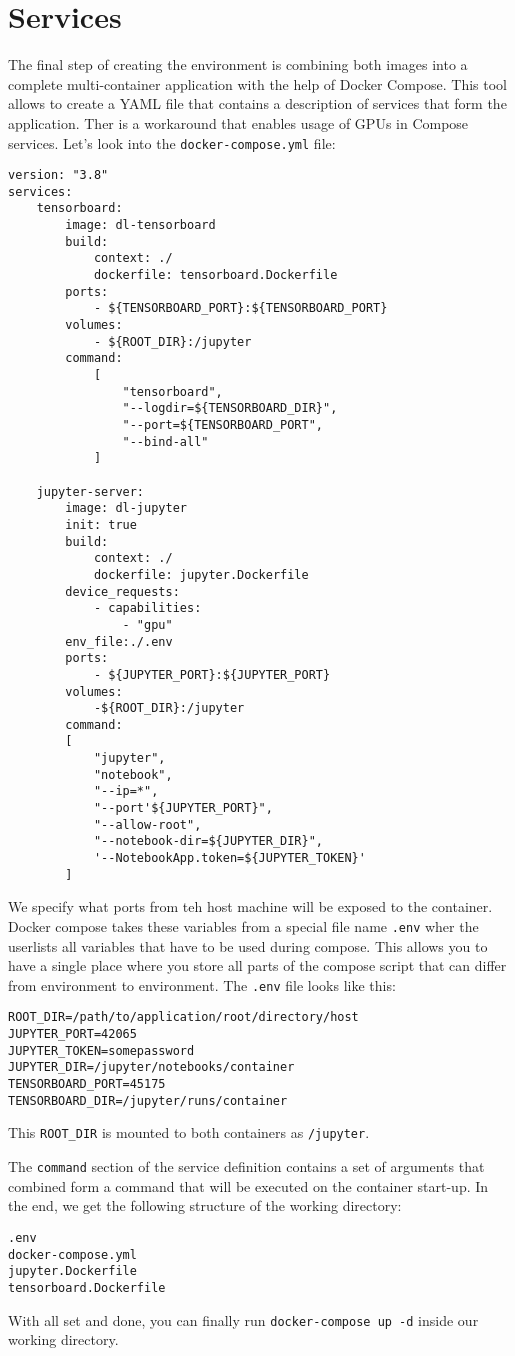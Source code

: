 \documentclass{article}
\begin{document}
\section{Services}
The final step of creating the environment is combining both images into a complete multi-container application with the help of Docker Compose.
This tool allows to create a YAML file that contains a description of services that form the application.
Ther is a workaround that enables usage of GPUs in Compose services.
Let's look into the \texttt{docker-compose.yml} file:
\begin{verbatim}
version: "3.8"
services:
    tensorboard:
        image: dl-tensorboard
        build:
            context: ./
            dockerfile: tensorboard.Dockerfile
        ports:
            - ${TENSORBOARD_PORT}:${TENSORBOARD_PORT}
        volumes:
            - ${ROOT_DIR}:/jupyter
        command:
            [
                "tensorboard",
                "--logdir=${TENSORBOARD_DIR}",
                "--port=${TENSORBOARD_PORT",
                "--bind-all"
            ]

    jupyter-server:
        image: dl-jupyter
        init: true
        build:
            context: ./
            dockerfile: jupyter.Dockerfile
        device_requests:
            - capabilities:
                - "gpu"
        env_file:./.env
        ports:
            - ${JUPYTER_PORT}:${JUPYTER_PORT}
        volumes:
            -${ROOT_DIR}:/jupyter
        command:
        [
            "jupyter",
            "notebook",
            "--ip=*",
            "--port'${JUPYTER_PORT}",
            "--allow-root",
            "--notebook-dir=${JUPYTER_DIR}",
            '--NotebookApp.token=${JUPYTER_TOKEN}'
        ]
\end{verbatim}
We specify what ports from teh host machine will be exposed to the container.
Docker compose takes these variables from a special file name \texttt{.env} wher the userlists all variables that have to be used during compose.
This allows you to have a single place where you store all parts of the compose script that can differ from environment to environment.
The \texttt{.env} file looks like this:
\begin{verbatim}
ROOT_DIR=/path/to/application/root/directory/host
JUPYTER_PORT=42065
JUPYTER_TOKEN=somepassword
JUPYTER_DIR=/jupyter/notebooks/container
TENSORBOARD_PORT=45175
TENSORBOARD_DIR=/jupyter/runs/container
\end{verbatim}
This \texttt{ROOT_DIR} is mounted to both containers as \texttt{/jupyter}.

The \texttt{command} section of the service definition contains a set of arguments that combined form a command that will be executed on the container start-up.
In the end, we get the following structure of the working directory:
\begin{verbatim}
.env
docker-compose.yml
jupyter.Dockerfile
tensorboard.Dockerfile
\end{verbatim}
With all set and done, you can finally run \texttt{docker-compose up -d} inside our working directory.
\end{document}
